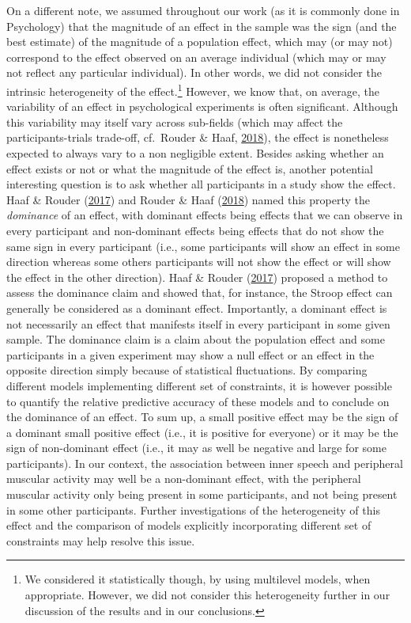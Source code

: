 \documentclass[a4paper,12pt,twoside,onecolumn,openright,final,oldfontcommands]{memoir}
\let\rmarkdownfootnote\footnote%
\def\footnote{\protect\rmarkdownfootnote}
\begin{document}
On a different note, we assumed throughout our work (as it is commonly done in Psychology) that the magnitude of an effect in the sample was the sign (and the best estimate) of the magnitude of a population effect, which may (or may not) correspond to the effect observed on an average individual (which may or may not reflect any particular individual). In other words, we did not consider the intrinsic heterogeneity of the effect.\footnote{We considered it statistically though, by using multilevel models, when appropriate. However, we did not consider this heterogeneity further in our discussion of the results and in our conclusions.} However, we know that, on average, the variability of an effect in psychological experiments is often significant. Although this variability may itself vary across sub-fields (which may affect the participants-trials trade-off, cf.~Rouder \& Haaf, \protect\hyperlink{ref-rouder_power_2018}{2018}), the effect is nonetheless expected to always vary to a non negligible extent. Besides asking whether an effect exists or not or what the magnitude of the effect is, another potential interesting question is to ask whether all participants in a study show the effect. Haaf \& Rouder (\protect\hyperlink{ref-haaf_developing_2017}{2017}) and Rouder \& Haaf (\protect\hyperlink{ref-rouder_power_2018}{2018}) named this property the \emph{dominance} of an effect, with dominant effects being effects that we can observe in every participant and non-dominant effects being effects that do not show the same sign in every participant (i.e., some participants will show an effect in some direction whereas some others participants will not show the effect or will show the effect in the other direction). Haaf \& Rouder (\protect\hyperlink{ref-haaf_developing_2017}{2017}) proposed a method to assess the dominance claim and showed that, for instance, the Stroop effect can generally be considered as a dominant effect. Importantly, a dominant effect is not necessarily an effect that manifests itself in every participant in some given sample. The dominance claim is a claim about the population effect and some participants in a given experiment may show a null effect or an effect in the opposite direction simply because of statistical fluctuations. By comparing different models implementing different set of constraints, it is however possible to quantify the relative predictive accuracy of these models and to conclude on the dominance of an effect. To sum up, a small positive effect may be the sign of a dominant small positive effect (i.e., it is positive for everyone) or it may be the sign of non-dominant effect (i.e., it may as well be negative and large for some participants). In our context, the association between inner speech and peripheral muscular activity may well be a non-dominant effect, with the peripheral muscular activity only being present in some participants, and not being present in some other participants. Further investigations of the heterogeneity of this effect and the comparison of models explicitly incorporating different set of constraints may help resolve this issue.
\end{document}
